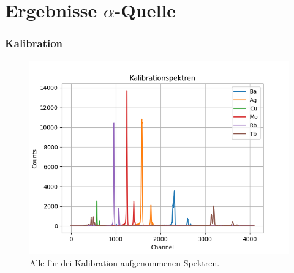 \documentclass[12pt,a4paper]{article}
\begin{document}
\section{Ergebnisse $\alpha$-Quelle}
\subsubsection{Kalibration}

\begin{figure}
\centering
\includegraphics[scale=0.9]{Bilder/alpha/kal_alles.png}
\caption{Alle für dei Kalibration aufgenommenen Spektren.}
\label{fig:kal_alles}
\end{figure}
\end{document}
